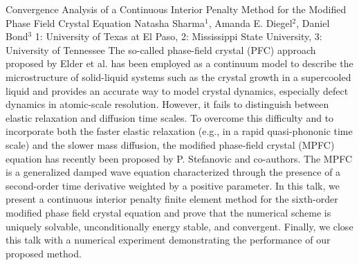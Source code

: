 \begin{addmargin}[2em]{0em}
\vspace{1.5ex}
\abs
{Convergence Analysis of a Continuous Interior Penalty Method for the Modified Phase Field Crystal Equation}
{Natasha Sharma$^{1}$, Amanda E. Diegel$^{2}$, Daniel Bond$^{3}$}
{1: University of Texas at El Paso, 2: Mississippi State University, 3: University of Tennessee}
{The so-called phase-field crystal (PFC) approach proposed by Elder et al. has been employed as a continuum model to describe the microstructure of solid-liquid systems such as the crystal growth in a supercooled liquid and provides an accurate way to model crystal dynamics, especially defect dynamics in atomic-scale resolution. However, it fails to distinguish between elastic relaxation and diffusion time scales. To overcome this difficulty and to incorporate both the faster elastic relaxation (e.g., in a rapid quasi-phononic time scale) and the slower mass diffusion, the modified phase-field crystal (MPFC) equation has recently been proposed by P. Stefanovic and co-authors. The MPFC is a generalized damped wave equation characterized through the presence of a second-order time derivative weighted by a positive parameter. In this talk, we present a continuous interior penalty finite element method for the sixth-order modified phase field crystal equation and  prove that the numerical scheme is uniquely solvable, unconditionally energy stable, and convergent. Finally, we close this talk with a numerical experiment demonstrating the performance of our proposed method.}



\end{addmargin}
